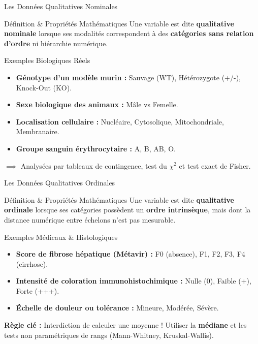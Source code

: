 \documentclass[aspectratio=169,10pt]{beamer}
\begin{document}
\begin{frame}{Les Données Qualitatives Nominales}
  \begin{conceptbox}{Définition \& Propriétés Mathématiques}
    Une variable est dite \textbf{qualitative nominale} lorsque ses modalités correspondent à des \textbf{catégories sans relation d'ordre} ni hiérarchie numérique.
  \end{conceptbox}
  \vspace{1.5mm}
  \begin{biobox}{Exemples Biologiques Réels}
    \begin{itemize}\setlength{\itemsep}{1.5pt}
      \item \textbf{Génotype d'un modèle murin :} Sauvage (WT), Hétérozygote (+/-), Knock-Out (KO).
      \item \textbf{Sexe biologique des animaux :} Mâle vs Femelle.
      \item \textbf{Localisation cellulaire :} Nucléaire, Cytosolique, Mitochondriale, Membranaire.
      \item \textbf{Groupe sanguin érythrocytaire :} A, B, AB, O.
    \end{itemize}
    $\implies$ Analysées par tableaux de contingence, test du $\chi^2$ et test exact de Fisher.
  \end{biobox}
\end{frame}

\begin{frame}{Les Données Qualitatives Ordinales}
  \begin{conceptbox}{Définition \& Propriétés Mathématiques}
    Une variable est dite \textbf{qualitative ordinale} lorsque ses catégories possèdent un \textbf{ordre intrinsèque}, mais dont la distance numérique entre échelons n'est pas mesurable.
  \end{conceptbox}
  \vspace{1.5mm}
  \begin{biobox}{Exemples Médicaux \& Histologiques}
    \begin{itemize}\setlength{\itemsep}{1.5pt}
      \item \textbf{Score de fibrose hépatique (Métavir) :} F0 (absence), F1, F2, F3, F4 (cirrhose).
      \item \textbf{Intensité de coloration immunohistochimique :} Nulle (0), Faible (+), Forte (+++).
      \item \textbf{Échelle de douleur ou tolérance :} Mineure, Modérée, Sévère.
    \end{itemize}
    \textbf{Règle clé :} Interdiction de calculer une moyenne ! Utiliser la \textbf{médiane} et les tests non paramétriques de rangs (Mann-Whitney, Kruskal-Wallis).
  \end{biobox}
\end{frame}
\end{document}
